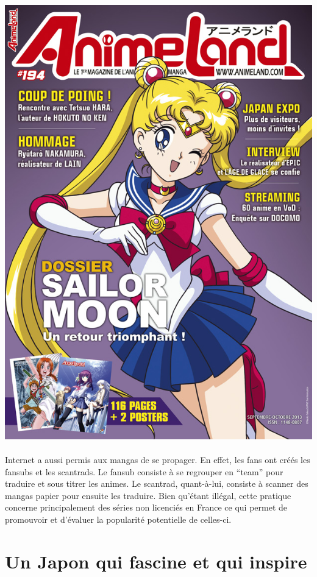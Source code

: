 \begin{center}
	\includegraphics[scale=0.8]{animeland.jpg}
\end{center}

\paragraph{} Internet a aussi permis aux mangas de se propager. En effet, les
fans ont créés les fansubs et les scantrads. Le fansub consiste à se regrouper
en ``team'' pour traduire et sous titrer les animes. Le scantrad, quant-à-lui,
consiste à scanner des mangas papier pour ensuite les traduire. Bien qu'étant
illégal, cette pratique concerne principalement des séries non licenciés en
France ce qui permet de promouvoir et d'évaluer la popularité potentielle de
celles-ci.

\section[Fascination et inspiration]{Un Japon qui fascine et qui inspire}

